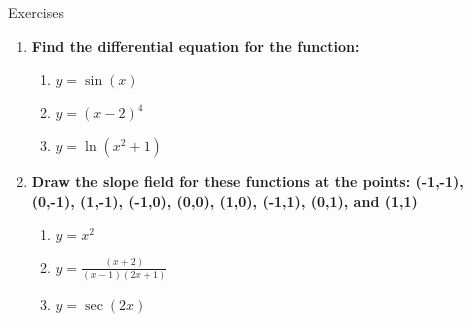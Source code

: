 \documentclass[../revisedmain.tex]{subfiles}
\begin{document}
\begin{center}
	\LARGE Exercises
\end{center}
\begin{enumerate}
	\item \textbf{Find the differential equation for the function:}
	\begin{enumerate}
		\item $y=\sin(x)$
		\item $y=(x-2)^4$
		\item $y=\ln(x^2+1)$
	\end{enumerate}
	\item \textbf{Draw the slope field for these functions at the points: (-1,-1), (0,-1), (1,-1), (-1,0), (0,0), (1,0), (-1,1), (0,1), and (1,1)}
	\begin{enumerate}
		\item $y=x^2$
		\item $y=\displaystyle\frac{(x+2)}{(x-1)(2x+1)}$
		\item $y=\sec(2x)$
	\end{enumerate}
\end{enumerate}
\end{document}
